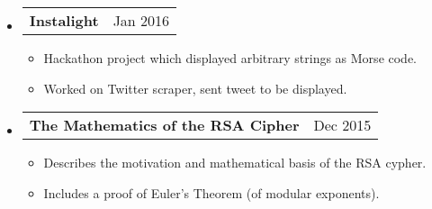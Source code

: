 \documentclass[18pt]{article}
\makeatletter
\providecommand{\tightlist}{
    \setlength{\itemsep}{0pt}\setlength{\parskip}{0pt}
}
\providecommand{\datetable}[2]{
    \begin{tabular*}{\textwidth}{@{}r @{\extracolsep{\fill}} l}
        #1 & #2
    \end{tabular*}
}
\makeatother
\begin{document}
\begin{itemize}[label={}]
      \item \datetable{\textbf{Instalight}}{Jan 2016}
      \begin{itemize}\tightlist
        \item Hackathon project which displayed arbitrary strings as Morse code.
        \item Worked on Twitter scraper, sent tweet to be displayed.
      \end{itemize}
      
      \item \datetable{\textbf{The Mathematics of the RSA Cipher}}{Dec 2015}
      \begin{itemize}\tightlist
        \item Describes the motivation and mathematical basis of the RSA cypher.
        \item Includes a proof of Euler's Theorem (of modular exponents).
      \end{itemize}
  \end{itemize}
    
\end{document}

